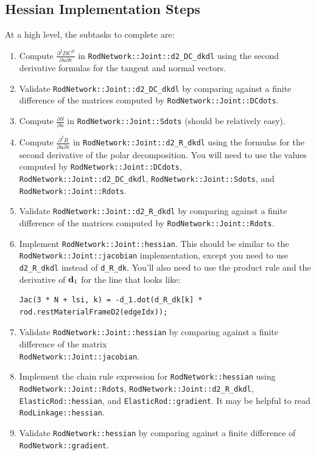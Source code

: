 \documentclass[10pt]{article}
\providecommand{\pder}[2]{\frac{\partial #1}{\partial #2}}
\providecommand{\spder}[3]{\frac{\partial^2 #1}{\partial #2 \partial #3}}
\renewcommand{\vec}[1]{{\bf #1}}
\def\d{\vec{d}}
\begin{document}
\subsection{Hessian Implementation Steps}
At a high level, the subtasks to complete are:
\begin{enumerate}
    \item Compute $\spder{D C^T}{u}{v}$ in \texttt{RodNetwork::Joint::d2\_DC\_dkdl} using the second
        derivative formulas for the tangent and normal vectors.
    \item Validate \texttt{RodNetwork::Joint::d2\_DC\_dkdl} by comparing against a finite
        difference of the matrices computed by \texttt{RodNetwork::Joint::DCdots}.
    \item Compute $\pder{S}{u}$ in \texttt{RodNetwork::Joint::Sdots} (should be relatively easy).
    \item Compute $\spder{R}{u}{v}$ in \texttt{RodNetwork::Joint::d2\_R\_dkdl} using the formulas for the second
        derivative of the polar decomposition. You will need to use the values computed by
        \texttt{RodNetwork::Joint::DCdots},
        \texttt{RodNetwork::Joint::d2\_DC\_dkdl},
        \texttt{RodNetwork::Joint::Sdots}, and 
        \texttt{RodNetwork::Joint::Rdots}.
    \item Validate \texttt{RodNetwork::Joint::d2\_R\_dkdl} by comparing against a finite
        difference of the matrices computed by \texttt{RodNetwork::Joint::Rdots}.
    \item Implement \texttt{RodNetwork::Joint::hessian}.
          This should be similar to the \texttt{RodNetwork::Joint::jacobian} implementation, except you need
          to use \texttt{d2\_R\_dkdl} instead of \texttt{d\_R\_dk}.
          You'll also need to use the product rule and the derivative of $\d_1$
          for the line that looks like:
          \begin{lstlisting}
Jac(3 * N + lsi, k) = -d_1.dot(d_R_dk[k] * rod.restMaterialFrameD2(edgeIdx));
          \end{lstlisting}
    \item Validate \texttt{RodNetwork::Joint::hessian} by comparing against a finite
        difference of the matrix \\
        \texttt{RodNetwork::Joint::jacobian}.
    \item Implement the chain rule expression for \texttt{RodNetwork::hessian} using 
        \texttt{RodNetwork::Joint::Rdots},
        \texttt{RodNetwork::Joint::d2\_R\_dkdl},
        \texttt{ElasticRod::hessian}, and
        \texttt{ElasticRod::gradient}. It may be helpful to read
        \texttt{RodLinkage::hessian}.
        
    \item Validate \texttt{RodNetwork::hessian} by comparing against a finite difference
        of \texttt{RodNetwork::gradient}.
\end{enumerate}
\end{document}
